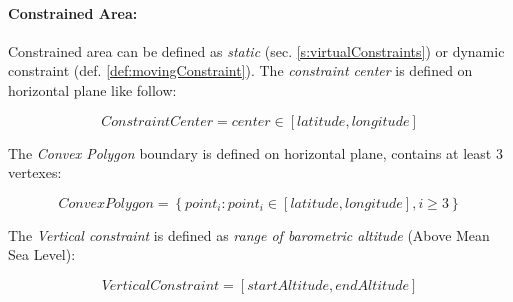 \newpage
\paragraph{Constrained Area:} Constrained area can be defined as \emph{static} (sec. \ref{s:virtualConstraints}) or dynamic constraint (def. \ref{def:movingConstraint}).  The \emph{constraint center} is defined on horizontal plane like follow:

\begin{equation}
    Constraint Center = center \in \left [latitude, longitude\right]
\end{equation}

\noindent The \emph{Convex Polygon} boundary is defined on horizontal plane, contains at least 3 vertexes:

\begin{equation}
    Convex Polygon = \left\{point_i:point_i\in \left [latitude, longitude\right], i \ge 3\right\}
\end{equation}

\noindent The \emph{Vertical constraint} is defined as \emph{range of barometric altitude} (Above Mean Sea Level):

\begin{equation}
    Vertical Constraint = \left [ start Altitude, end Altitude \right ]
\end{equation}

